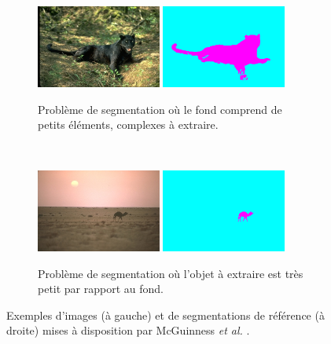 \begin{figure}[htb]
	\centering	
	 \begin{subfigure}[B]{\textwidth}
	 \centering
			\includegraphics[width=0.45\textwidth]{images/evaluation/McGuinness/304034.jpg}
			\includegraphics[width=0.45\textwidth]{images/evaluation/McGuinness/304034.png}
		 \caption{Problème de segmentation où le fond comprend de petits éléments, complexes à extraire.}
	\end{subfigure}		
	\\	
	 \begin{subfigure}[B]{\textwidth}	
	 \centering
			\includegraphics[width=0.45\textwidth]{images/evaluation/McGuinness/271031.jpg}
			\includegraphics[width=0.45\textwidth]{images/evaluation/McGuinness/271031.png}
		 \caption{Problème de segmentation où l'objet à extraire est très petit par rapport au fond.}
	\end{subfigure}	
	\caption{Exemples d'images (à gauche) et de segmentations de référence (à droite) mises à disposition par McGuinness \textit{et al.} \cite{mcguinness2010comparative}.}
	\label{fig:eval:MgDBEx}
\end{figure}


